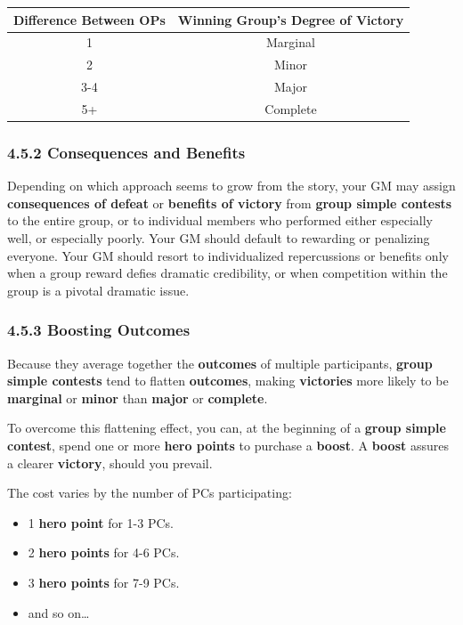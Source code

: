 \documentclass[
]{article}
\providecommand{\tightlist}{%
  \setlength{\itemsep}{0pt}\setlength{\parskip}{0pt}}
\begin{document}
\begin{longtable}[]{@{}cc@{}}
\toprule
Difference Between OPs & Winning Group's Degree of
Victory\tabularnewline
\midrule
\endhead
1 & Marginal\tabularnewline
2 & Minor\tabularnewline
3-4 & Major\tabularnewline
5+ & Complete\tabularnewline
\bottomrule
\end{longtable}

\hypertarget{consequences-and-benefits}{%
\subsubsection{4.5.2 Consequences and
Benefits}\label{consequences-and-benefits}}

Depending on which approach seems to grow from the story, your GM may
assign \textbf{consequences of defeat} or \textbf{benefits of victory}
from \textbf{group simple contests} to the entire group, or to
individual members who performed either especially well, or especially
poorly. Your GM should default to rewarding or penalizing everyone. Your
GM should resort to individualized repercussions or benefits only when a
group reward defies dramatic credibility, or when competition within the
group is a pivotal dramatic issue.

\hypertarget{boosting-outcomes}{%
\subsubsection{4.5.3 Boosting Outcomes}\label{boosting-outcomes}}

Because they average together the \textbf{outcomes} of multiple
participants, \textbf{group simple contests} tend to flatten
\textbf{outcomes}, making \textbf{victories} more likely to be
\textbf{marginal} or \textbf{minor} than \textbf{major} or
\textbf{complete}.

To overcome this flattening effect, you can, at the beginning of a
\textbf{group simple contest}, spend one or more \textbf{hero points} to
purchase a \textbf{boost}. A \textbf{boost} assures a clearer
\textbf{victory}, should you prevail.

The cost varies by the number of PCs participating:

\begin{itemize}
\tightlist
\item
  1 \textbf{hero point} for 1-3 PCs.
\item
  2 \textbf{hero points} for 4-6 PCs.
\item
  3 \textbf{hero points} for 7-9 PCs.\\
\item
  and so on\ldots{}
\end{itemize}
\end{document}
